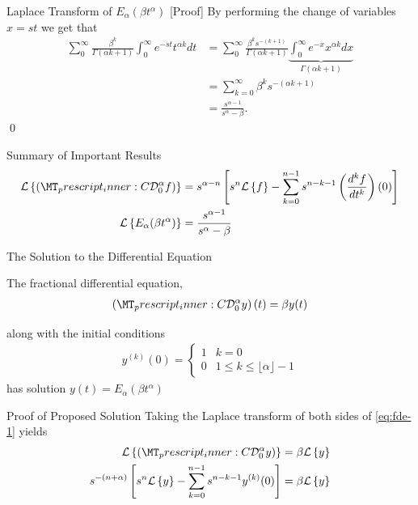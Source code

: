 \documentclass[pdf]{beamer}
\newcommand{\laplace}[1]{ \mathcal{L} \left\{ #1 \right\} }
\newcommand{\der}[3]{ \frac{d^{#3}#1}{d#2^{#3}} }
\newcommand{\capder}[3]{ \left( \prescript{C}{}{\mathcal{D}_{#1}^{#2}} #3 \right) }
\begin{document}
\begin{frame}{Laplace Transform of $E_\alpha(\beta t^\alpha)$ [Proof]}
	By performing the change of variables $ x =st $ we get that 
	\begin{align*}
		\sum_0^\infty \frac{\beta^k}{\Gamma(\alpha k + 1)} \int_0^\infty e^{-st} t^{\alpha k} dt 
			&= \sum_0^\infty \frac{\beta^k s^{-(k+1)}}{\Gamma(\alpha k + 1)} \underbrace{\int_0^\infty e^{-x} x^{\alpha k} dx}_{\Gamma(\alpha k + 1)} \\
			&= \sum_{k=0}^\infty \beta^{k} s^{-(\alpha k + 1)} \\
			&= \frac{s^{\alpha-1}}{s^\alpha - \beta}.	
	\end{align*}
	\qed
\end{frame}

\begin{frame}{Summary of Important Results}
	\begin{align*}
		\laplace{\capder{0}{\alpha}{f}} &= s^{\alpha - n} \left[ s^n \laplace{f} - \sum_{k=0}^{n-1} s^{n-k-1} \left( \der{f}{t}{k} \right)(0) \right] \\
		\laplace{ E_\alpha (\beta t^\alpha)} &= \frac{s^{\alpha - 1}}{s^\alpha - \beta}
	\end{align*}
\end{frame}



\begin{frame}{The Solution to the Differential Equation}
	\begin{lemma}
		The fractional differential equation,
		\begin{align}
			\label{eq:fde-1}
			\left( \prescript{C}{}{\mathcal{D}_0^\alpha}y \right)(t) = \beta y(t) 
		\end{align}

		along with the initial conditions 
		\begin{align}
			\label{eq:fde-1-ic}
			y^{(k)}(0) = 
			\begin{cases}
				1 & k = 0 \\
				0 & 1 \leq k \leq \lfloor \alpha \rfloor - 1  
			\end{cases}
		\end{align}
		has solution
		$ y(t) = E_\alpha \left( \beta t^\alpha \right) $
	\end{lemma}
\end{frame}

\begin{frame}{Proof of Proposed Solution}
	Taking the Laplace transform of both sides of \eqref{eq:fde-1} yields
	\begin{align*}
		\laplace{\capder{0}{\alpha}{y}} &= \beta \laplace{y} \\
		s^{-(n+\alpha)} \left[s^n \laplace{y} - \sum_{k=0}^{n-1} s^{n-k-1} y^{(k)}(0) \right] &= \beta \laplace{y}
	\end{align*}
\end{frame}
\end{document}
